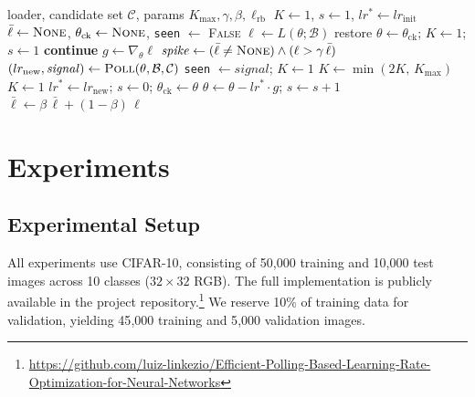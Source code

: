 \documentclass[conference]{IEEEtran}
\begin{document}
\begin{algorithm}[htbp]
\caption{Efficient Polling (one epoch)}
\label{alg:efficient}
\begin{algorithmic}[1]
\REQUIRE loader, candidate set $\mathcal{C}$, params $K_{\max}, \gamma, \beta, \ell_{\mathrm{rb}}$
\STATE $K \leftarrow 1$,\; $s \leftarrow 1$,\; $lr^{*} \leftarrow lr_{\mathrm{init}}$ 
\STATE $\bar{\ell} \leftarrow \textsc{None}$,\; $\theta_{\mathrm{ck}} \leftarrow \textsc{None}$,\; \texttt{seen} $\leftarrow$ \textsc{False}
    \STATE $\ell \leftarrow L(\theta; \mathcal{B})$
        \STATE restore $\theta \leftarrow \theta_{\mathrm{ck}}$;\; $K \leftarrow 1$;\; $s \leftarrow 1$ 
        \STATE \textbf{continue}
    \ENDIF
    \STATE $g \leftarrow \nabla_\theta \ell$
    \STATE $\mathit{spike} \leftarrow (\bar{\ell} \neq \textsc{None}) \wedge (\ell > \gamma\,\bar{\ell})$ 
        \STATE $(lr_{\mathrm{new}}, \mathit{signal}) \leftarrow \textsc{Poll}(\theta, \mathcal{B}, \mathcal{C})$
            \STATE \texttt{seen} $\leftarrow \mathit{signal}$;\; $K \leftarrow 1$
            \STATE $K \leftarrow \min(2K,\, K_{\max})$ 
        \ELSE
            \STATE $K \leftarrow 1$ 
        \ENDIF
        \STATE $lr^{*} \leftarrow lr_{\mathrm{new}}$;\; $s \leftarrow 0$;\; $\theta_{\mathrm{ck}} \leftarrow \theta$ 
    \ELSE
        \STATE $\theta \leftarrow \theta - lr^{*} \cdot g$;\; $s \leftarrow s + 1$ 
    \ENDIF
    \STATE $\bar{\ell} \leftarrow \beta\,\bar{\ell} + (1-\beta)\,\ell$ 
\ENDFOR
\end{algorithmic}
\end{algorithm}

\section{Experiments}

\subsection{Experimental Setup}

All experiments use CIFAR-10, consisting of 50{,}000 training and 10{,}000 test images across 10 classes ($32\!\times\!32$ RGB). The full implementation is publicly available in the project repository.\footnote{\url{https://github.com/luiz-linkezio/Efficient-Polling-Based-Learning-Rate-Optimization-for-Neural-Networks}} We reserve 10\% of training data for validation, yielding 45{,}000 training and 5{,}000 validation images.
\end{document}
